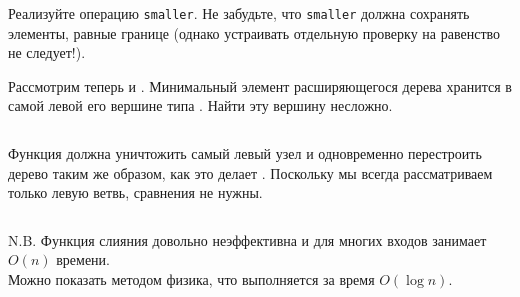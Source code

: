 \ifanswers
\begin{frame}[fragile]{}
\begin{exercise}\label{ex:5.4}
  Реализуйте операцию \lstinline!smaller!. Не забудьте, что
  \lstinline!smaller! должна сохранять элементы, равные границе (однако
  устраивать отдельную проверку на равенство не следует!).
\end{exercise}
\end{frame}
\fi 


\begin{frame}[fragile]{}
Рассмотрим теперь  и
. Минимальный элемент расширяющегося дерева
хранится в самой левой его вершине типа . Найти эту
вершину несложно.
\inputminted[firstline=42,lastline=44,gobble=2] {haskell}{code/SplayHeap.lhs}

Функция  должна уничтожить самый левый узел и
одновременно перестроить дерево таким же образом, как это делает
. Поскольку мы всегда рассматриваем только левую
ветвь, сравнения не нужны.
\inputminted[firstline=46,lastline=49,gobble=2] {haskell}{code/SplayHeap.lhs}


\end{frame}

\begin{frame}[fragile]{}
N.B. Функция слияния
 довольно неэффективна и для многих входов
занимает $O(n)$ времени.\\

Можно показать методом физика, что  выполняется за время
$O(\log n)$.
\end{frame}

